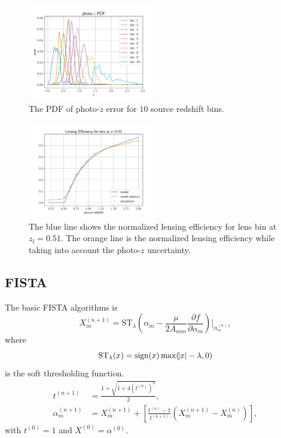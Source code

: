 \documentclass[twocolumn]{aastex62}
\begin{document}
\begin{figure}
 \centering
 \includegraphics[width=0.5\textwidth]{mlz-poz.pdf}
 \caption{The PDF of photo-$z$ error for $10$ source redshift bins.}
\end{figure}

\begin{figure}
 \centering
 \includegraphics[width=0.5\textwidth]{lensing_efficiency.pdf}
 \caption{The blue line shows the normalized lensing efficiency for lens bin at $z_{l}=0.51$. The orange line is the normalized lensing efficiency while taking into account the photo-$z$ uncertainty.}
\end{figure}
\subsection{FISTA}
The basic FISTA algorithms is
\begin{equation}
X^{(n+1)}_m=\mathrm{ST}_{\lambda} (\alpha_m -\frac{\mu}{2A_{mm}} \frac{\partial f}{\partial \alpha_m})|_{\alpha^{(n)}_m} ,
\end{equation}
where
\begin{equation}
\mathrm{ST}_{\lambda} (x) = \mathrm{sign} (x) \max (\abs{x}-\lambda,0)
\end{equation}
is the soft thresholding function.
\begin{equation}
\begin{split}
t^{(n+1)} &= \frac{1+\sqrt{1+4(t^{(n)})^2}}{2},\\
\alpha^{(n+1)}_m&=X^{(n+1)}_m+[\frac{t^{(n)}-1}{t^{(n+1)}}(X^{(n+1)}_m-X^{(n)}_m)],
\end{split}
\end{equation}
with $t^{(0)}=1$ and $X^{(0)}=\alpha^{(0)}$.
\end{document}
